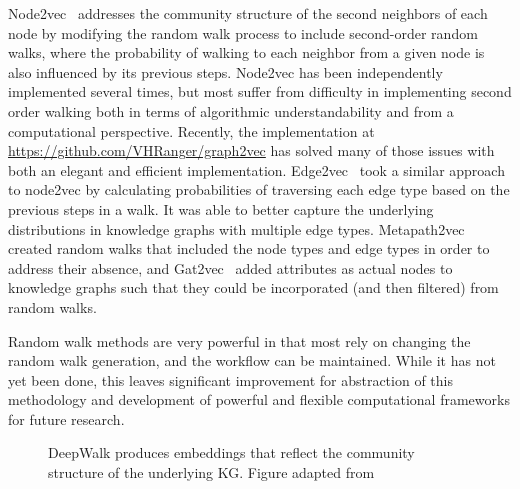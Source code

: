 Node2vec~\cite{Grover2016} addresses the community structure of the second neighbors of each node by modifying the random walk process to include second-order random walks, where the probability of walking to each neighbor from a given node is also influenced by its previous steps.
Node2vec has been independently implemented several times, but most suffer from difficulty in implementing second order walking both in terms of algorithmic understandability and from a computational perspective.
Recently, the implementation at \url{https://github.com/VHRanger/graph2vec} has solved many of those issues with both an elegant and efficient implementation.
Edge2vec~\cite{Gao2018} took a similar approach to node2vec by calculating probabilities of traversing each edge type based on the previous steps in a walk.
It was able to better capture the underlying distributions in knowledge graphs with multiple edge types.
Metapath2vec~\cite{Dong2017} created random walks that included the node types and edge types in order to address their absence, and Gat2vec~\cite{Sheikh2018} added attributes as actual nodes to knowledge graphs such that they could be incorporated (and then filtered) from random walks.

Random walk methods are very powerful in that most rely on changing the random walk generation, and the workflow can be maintained.
While it has not yet been done, this leaves significant improvement for abstraction of this methodology and development of powerful and flexible computational frameworks for future research.

\begin{figure}
    \captionsetup{format=plain}
    \caption[DeepWalk Embeddings Reflect Community Structure]{DeepWalk produces embeddings that reflect the community structure of the underlying \ac{KG}. Figure adapted from~\cite{Perozzi2014}}
    \label{fig:deepwalk_embedding}
\end{figure}


